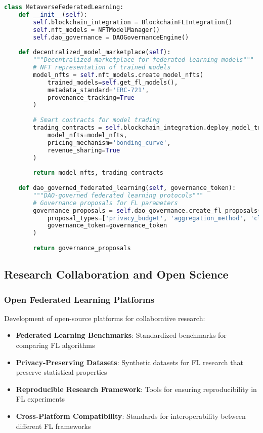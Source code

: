 \begin{lstlisting}[language=python, caption=Metaverse FL Integration]
class MetaverseFederatedLearning:
    def __init__(self):
        self.blockchain_integration = BlockchainFLIntegration()
        self.nft_models = NFTModelManager()
        self.dao_governance = DAOGovernanceEngine()
        
    def decentralized_model_marketplace(self):
        """Decentralized marketplace for federated learning models"""
        # NFT representation of trained models
        model_nfts = self.nft_models.create_model_nfts(
            trained_models=self.get_fl_models(),
            metadata_standard='ERC-721',
            provenance_tracking=True
        )
        
        # Smart contracts for model trading
        trading_contracts = self.blockchain_integration.deploy_model_trading_contracts(
            model_nfts=model_nfts,
            pricing_mechanism='bonding_curve',
            revenue_sharing=True
        )
        
        return model_nfts, trading_contracts
        
    def dao_governed_federated_learning(self, governance_token):
        """DAO-governed federated learning protocols"""
        # Governance proposals for FL parameters
        governance_proposals = self.dao_governance.create_fl_proposals(
            proposal_types=['privacy_budget', 'aggregation_method', 'client_selection'],
            governance_token=governance_token
        )
        
        return governance_proposals
\end{lstlisting}

\subsection{Research Collaboration and Open Science}

\subsubsection{Open Federated Learning Platforms}

Development of open-source platforms for collaborative research:

\begin{itemize}
    \item \textbf{Federated Learning Benchmarks}: Standardized benchmarks for comparing FL algorithms
    \item \textbf{Privacy-Preserving Datasets}: Synthetic datasets for FL research that preserve statistical properties
    \item \textbf{Reproducible Research Framework}: Tools for ensuring reproducibility in FL experiments
    \item \textbf{Cross-Platform Compatibility}: Standards for interoperability between different FL frameworks
\end{itemize}

